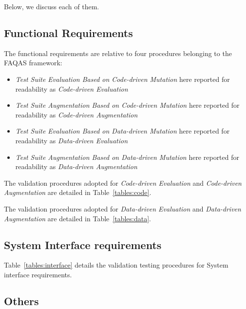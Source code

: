 Below, we discuss each of them.

\subsection{Functional Requirements}

The functional requirements are relative to four procedures belonging to the FAQAS framework:
\begin{itemize}
  \item \emph{Test Suite Evaluation Based on Code-driven Mutation} here reported for readability as \emph{Code-driven Evaluation}
  \item \emph{Test Suite Augmentation Based on Code-driven Mutation} here reported for readability as \emph{Code-driven Augmentation}
  \item \emph{Test Suite Evaluation Based on Data-driven Mutation} here reported for readability as \emph{Data-driven Evaluation}
  \item \emph{Test Suite Augmentation Based on Data-driven Mutation} here reported for readability as \emph{Data-driven Augmentation}
\end{itemize}

The validation procedures adopted for \emph{Code-driven Evaluation} and \emph{Code-driven Augmentation} are detailed in Table~\ref{tables:code}.



The validation procedures adopted for \emph{Data-driven Evaluation} and \emph{Data-driven Augmentation} are detailed in Table~\ref{tables:data}.




\clearpage

\subsection{System Interface requirements}

Table~\ref{tables:interface} details the validation testing procedures for System interface requirements.



\subsection{Others}

